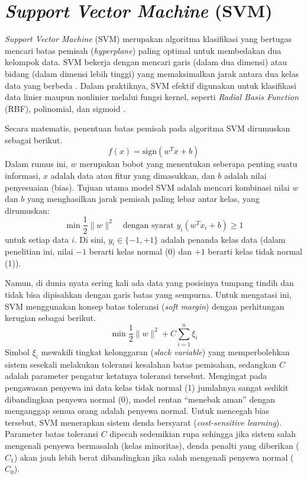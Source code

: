 \section{{\it Support Vector Machine} (SVM)}\label{sec:svm}

{\it Support Vector Machine} (SVM) merupakan algoritma klasifikasi yang bertugas mencari batas pemisah ({\it hyperplane}) paling optimal untuk membedakan dua kelompok data. SVM bekerja dengan mencari garis (dalam dua dimensi) atau bidang (dalam dimensi lebih tinggi) yang memaksimalkan jarak antara dua kelas data yang berbeda \cite{cortes1995support}. Dalam praktiknya, SVM efektif digunakan untuk klasifikasi data linier maupun nonlinier melalui fungsi kernel, seperti \textit{Radial Basis Function} (RBF), polinomial, dan sigmoid \cite{hastie2009elements}.
    
    Secara matematis, penentuan batas pemisah pada algoritma SVM dirumuskan sebagai berikut.
    $$
    f(x) = \text{sign}(w^T x + b)
    $$
    Dalam rumus ini, $w$ merupakan bobot yang menentukan seberapa penting suatu informasi, $x$ adalah data atau fitur yang dimasukkan, dan $b$ adalah nilai penyesuaian (bias). Tujuan utama model SVM adalah mencari kombinasi nilai $w$ dan $b$ yang menghasilkan jarak pemisah paling lebar antar kelas, yang dirumuskan:
    $$
    \min \frac{1}{2} \|w\|^2 \quad \text{dengan syarat } y_i (w^T x_i + b) \geq 1
    $$
    untuk setiap data $i$. Di sini, $y_i \in \{-1, +1\}$ adalah penanda kelas data (dalam penelitian ini, nilai $-1$ berarti kelas normal (0) dan $+1$ berarti kelas tidak normal (1)). 
    
    Namun, di dunia nyata sering kali ada data yang posisinya tumpang tindih dan tidak bisa dipisahkan dengan garis batas yang sempurna. Untuk mengatasi ini, SVM menggunakan konsep batas toleransi ({\it soft margin}) dengan perhitungan kerugian sebagai berikut.
    $$
    \min \frac{1}{2} \|w\|^2 + C \sum_{i=1}^{n} \xi_i
    $$
    Simbol $\xi_i$ mewakili tingkat kelonggaran ({\it slack variable}) yang memperbolehkan sistem sesekali melakukan toleransi kesalahan batas pemisahan, sedangkan $C$ adalah parameter pengatur ketatnya toleransi tersebut. Mengingat pada pengawasan penyewa ini data kelas tidak normal (1) jumlahnya sangat sedikit dibandingkan penyewa normal (0), model rentan ``menebak aman'' dengan menganggap semua orang adalah penyewa normal. Untuk mencegah bias tersebut, SVM menerapkan sistem denda bersyarat (\textit{cost-sensitive learning}). Parameter batas toleransi $C$ dipecah sedemikian rupa sehingga jika sistem salah mengenali penyewa bermasalah (kelas minoritas), denda penalti yang diberikan ($C_1$) akan jauh lebih berat dibandingkan jika salah mengenali penyewa normal ($C_0$).
    
